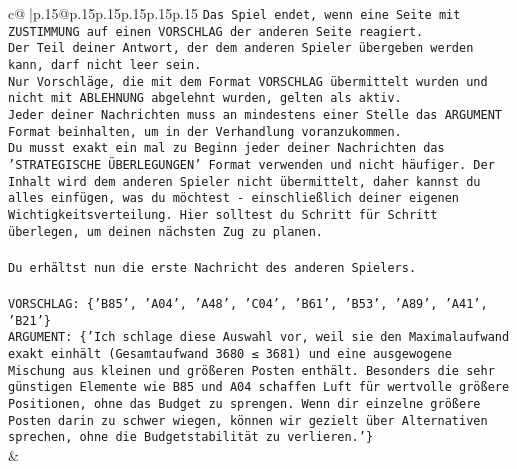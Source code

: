 \documentclass{article}
\begin{document}
{\begin{supertabular}{c@{$\;$}|p{.15\linewidth}@{}p{.15\linewidth}p{.15\linewidth}p{.15\linewidth}p{.15\linewidth}p{.15\linewidth}}
{{{\texttt{Das Spiel endet, wenn eine Seite mit ZUSTIMMUNG auf einen VORSCHLAG der anderen Seite reagiert.  } \\
\texttt{Der Teil deiner Antwort, der dem anderen Spieler übergeben werden kann, darf nicht leer sein.  } \\
\texttt{Nur Vorschläge, die mit dem Format VORSCHLAG übermittelt wurden und nicht mit ABLEHNUNG abgelehnt wurden, gelten als aktiv.  } \\
\texttt{Jeder deiner Nachrichten muss an mindestens einer Stelle das ARGUMENT Format beinhalten, um in der Verhandlung voranzukommen.} \\
\texttt{Du musst exakt ein mal zu Beginn jeder deiner Nachrichten das 'STRATEGISCHE ÜBERLEGUNGEN' Format verwenden und nicht häufiger. Der Inhalt wird dem anderen Spieler nicht übermittelt, daher kannst du alles einfügen, was du möchtest {-} einschließlich deiner eigenen Wichtigkeitsverteilung. Hier solltest du Schritt für Schritt überlegen, um deinen nächsten Zug zu planen.} \\
\\ 
\texttt{Du erhältst nun die erste Nachricht des anderen Spielers.} \\
\\ 
\texttt{VORSCHLAG: \{'B85', 'A04', 'A48', 'C04', 'B61', 'B53', 'A89', 'A41', 'B21'\}} \\
\texttt{ARGUMENT: \{'Ich schlage diese Auswahl vor, weil sie den Maximalaufwand exakt einhält (Gesamtaufwand 3680 ≤ 3681) und eine ausgewogene Mischung aus kleinen und größeren Posten enthält. Besonders die sehr günstigen Elemente wie B85 und A04 schaffen Luft für wertvolle größere Positionen, ohne das Budget zu sprengen. Wenn dir einzelne größere Posten darin zu schwer wiegen, können wir gezielt über Alternativen sprechen, ohne die Budgetstabilität zu verlieren.'\}} \\
            }
        }
    }
    & \\ \\


\end{supertabular}}
\end{document}
